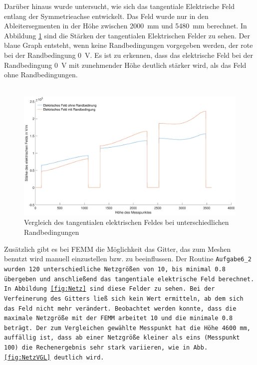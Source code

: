 \newpage
Darüber hinaus wurde untersucht, wie sich das tangentiale Elektrische Feld entlang der Symmetrieachse entwickelt. Das Feld wurde nur in den Ableitersegmenten in der Höhe zwischen \SI{2000}{\milli\meter} und \SI{5480}{\milli\meter} berechnet. In Abbildung \ref{fig:Vgl} sind die Stärken der tangentialen Elektrischen Felder zu sehen. Der blaue Graph entsteht, wenn keine Randbedingungen vorgegeben werden, der rote bei der Randbedingung \SI{0}{\volt}. Es ist zu erkennen, dass das elektrische Feld bei der Randbedingung \SI{0}{\volt} mit zunehmender Höhe deutlich stärker wird, als das Feld ohne Randbedingungen. \\ \\

\begin{figure}[h]
	\centering
	\includegraphics[width=\textwidth]{data/VergleichRandbedingung}
	\caption{Vergleich des tangentialen elektrischen Feldes bei unterschiedlichen Randbedingungen}
	\label{fig:Vgl}
\end{figure}


Zusätzlich gibt es bei FEMM die Möglichkeit das Gitter, das zum Meshen benutzt wird manuell einzustellen bzw. zu beeinflussen. Der Routine \tt{Aufgabe6\_2} wurden 120 unterschiedliche Netzgrößen von 10, bis minimal 0.8 übergeben und anschließend das tangentiale elektrische Feld berechnet. In Abbildung \ref{fig:Netz} sind diese Felder zu sehen. Bei der Verfeinerung des Gitters ließ sich kein Wert ermitteln, ab dem sich das Feld nicht mehr verändert. Beobachtet werden konnte, dass die maximale Netzgröße mit der FEMM arbeitet 10 und die minimale 0.8 beträgt. Der zum Vergleichen gewählte Messpunkt hat die Höhe \SI{4600}{\milli\meter}, auffällig ist, dass ab einer Netzgröße kleiner als eins (Messpunkt 100) die Rechenergebnis sehr stark variieren, wie in Abb. \ref{fig:NetzVGL} deutlich wird. \\ \\

